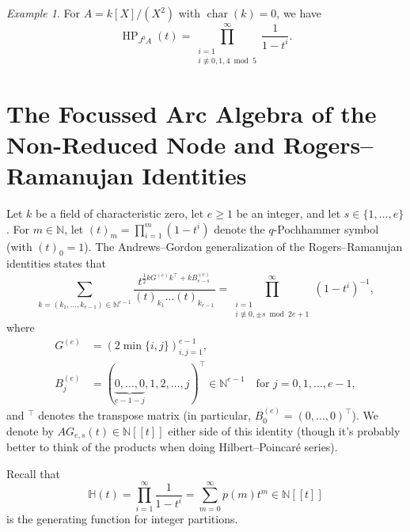 \documentclass[a4paper, 12pt]{amsart}
\theoremstyle{remark}
\newtheorem{example}[theorem]{Example}
\begin{document}
\begin{example}
  \label{exa:2}
  For $A = k[X]/(X^2)$ with $\operatorname{char}(k) = 0$, we have
  \begin{equation*}
    \operatorname{HP}_{J^0 A}(t) = \prod^\infty_{\substack{i = 1 \\ i \not\equiv 0, 1, 4 \bmod 5}} \frac{1}{1 - t^i}.
  \end{equation*}
\end{example}

\section{The Focussed Arc Algebra of the Non-Reduced Node and Rogers--Ramanujan Identities}
\label{sec:focused-arc-algebra-xy2}

Let $k$ be a field of characteristic zero,
let $e \ge 1$ be an integer,
and let $s \in \{1, \dots, e\}$.
For $m \in \mathbb{N}$, let $(t)_m = \prod_{i = 1}^m (1 - t^i)$ denote the $q$-Pochhammer symbol (with $(t)_0 = 1$).
The Andrews--Gordon generalization of the Rogers--Ramanujan identities states that
\begin{equation*}
  \sum_{k = (k_1, \dots, k_{e - 1}) \in \mathbb{N}^{e - 1}}\frac{t^{\frac{1}{2}kG^{(e)}k^\top + kB^{(e)}_{e - s}}}{(t)_{k_1}\dots(t)_{k_{e - 1}}} = \prod^\infty_{\substack{i = 1 \\ i \not\equiv 0, \pm s \bmod 2e + 1}}(1 - t^i)^{-1},
\end{equation*}
where
\begin{align*}
  G^{(e)} &= (2\min\{i, j\})_{i, j = 1}^{e - 1}, \\
  B^{(e)}_j &= (\underbrace{0, \dots, 0}_{e - 1 - j}, 1, 2, \dots, j)^\top \in \mathbb{N}^{e - 1} \quad \text{for $j = 0, 1, \dots, e - 1$},
\end{align*}
and ${}^\top$ denotes the transpose matrix (in particular, $B^{(e)}_0 = (0, \dots, 0)^\top$).
We denote by $AG_{e, s}(t) \in \mathbb{N}[[t]]$ either side of this identity (though it's probably better to think of the products when doing Hilbert--Poincaré series).

Recall that
\begin{equation}
  \mathbb{H}(t) = \prod_{i=1}^\infty \frac{1}{1 - t^i} = \sum_{m=0}^\infty p(m)t^m \in \mathbb{N}[[t]]
\end{equation}
is the generating function for integer partitions.
\end{document}
